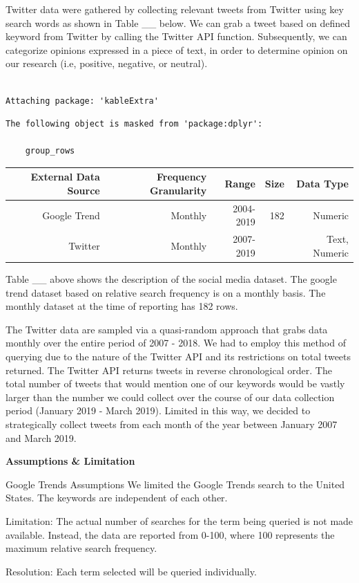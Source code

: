 \documentclass[12pt,oneside]{chicagocapstone}
\begin{document}
Twitter data were gathered by collecting relevant tweets from Twitter
using key search words as shown in Table \_\_ below. We can grab a tweet
based on defined keyword from Twitter by calling the Twitter API
function. Subsequently, we can categorize opinions expressed in a piece
of text, in order to determine opinion on our research (i.e, positive,
negative, or neutral).
\begin{verbatim}

Attaching package: 'kableExtra'
\end{verbatim}
\begin{verbatim}
The following object is masked from 'package:dplyr':

    group_rows
\end{verbatim}
\begin{longtable}[]{@{}rrrrr@{}}
\toprule
External Data Source & Frequency Granularity & Range & Size & Data
Type\tabularnewline
\midrule
\endhead
Google Trend & Monthly & 2004-2019 & 182 & Numeric\tabularnewline
Twitter & Monthly & 2007-2019 & & Text, Numeric\tabularnewline
\bottomrule
\end{longtable}
Table \_\_ above shows the description of the social media dataset. The
google trend dataset based on relative search frequency is on a monthly
basis. The monthly dataset at the time of reporting has 182 rows.

The Twitter data are sampled via a quasi-random approach that grabs data
monthly over the entire period of 2007 - 2018. We had to employ this
method of querying due to the nature of the Twitter API and its
restrictions on total tweets returned. The Twitter API returns tweets in
reverse chronological order. The total number of tweets that would
mention one of our keywords would be vastly larger than the number we
could collect over the course of our data collection period (January
2019 - March 2019). Limited in this way, we decided to strategically
collect tweets from each month of the year between January 2007 and
March 2019.

\textbf{Assumptions \& Limitation}

Google Trends Assumptions We limited the Google Trends search to the
United States. The keywords are independent of each other.

Limitation: The actual number of searches for the term being queried is
not made available. Instead, the data are reported from 0-100, where 100
represents the maximum relative search frequency.

Resolution: Each term selected will be queried individually.
\end{document}
